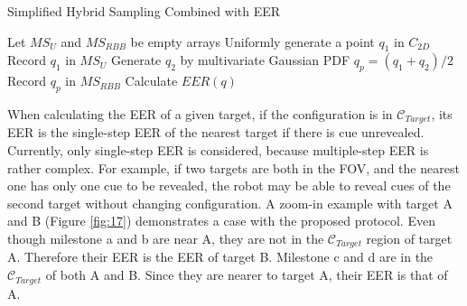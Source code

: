 \documentclass[12pt,draftcls,onecolumn]{IEEEtran}
\begin{document}
\begin{algorithm}
   \caption{Simplified Hybrid Sampling Combined with EER}
    \begin{algorithmic}[1]
        \State Let $MS_{U}$ and $MS_{RBB}$ be empty arrays
            \State Uniformly generate a point $q_1$ in $C_{2D}$  
	 \State Record $q_1$ in $MS_{U}$
	 \Else
             \State Generate $q_2$ by multivariate Gaussian PDF
	  \State $q_p = (q_1+q_2)/2$	
	  \State Record $q_p$ in $MS_{RBB}$
	  \EndIf 	
             \EndIf 
	 \EndWhile	 
	 \EndIf
        \EndWhile
        \State Calculate $EER(q)$ 
        \EndFor
      
       \EndFunction
\end{algorithmic}
\end{algorithm}

\clearpage



%



When calculating the EER of a given target, if the configuration is in $\mathcal{C}_{Target}$, its EER is the single-step EER of the nearest target if there is cue unrevealed. 
Currently, only single-step EER is considered, because multiple-step EER is rather complex.
 For example, if two targets are both in the FOV, and the nearest one has only one cue to be revealed, the robot may be able to reveal cues of the second target without changing configuration.
A zoom-in example with target A and B (Figure \ref{fig:17}) demonstrates a case with the proposed protocol.
Even though milestone a and b are near A, they are not in the  $\mathcal{C}_{Target}$ region of target A. 
Therefore their EER is the EER of target B.
Milestone c and d are in the $\mathcal{C}_{Target}$ of both A and B. 
Since they are nearer to target A, their EER is that of A.
\end{document}
